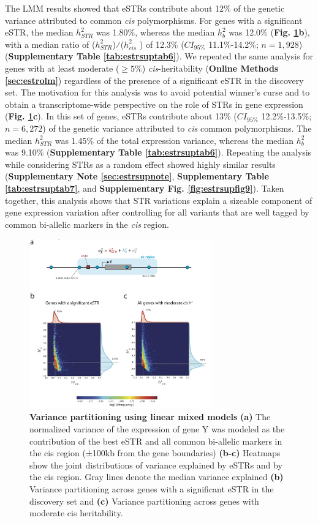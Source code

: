 The LMM results showed that eSTRs contribute about 12\% of the genetic variance attributed to common \emph{cis} polymorphisms. For genes with a significant eSTR, the median $h_{STR}^2$ was 1.80\%, whereas the median $h_b^2$ was 12.0\% (\textbf{Fig. \ref{fig:estrfig2}b}), with a median ratio of ($h_{STR}^2$)⁄($h_{cis}^2$ ) of 12.3\% ($CI_{95\%}$ 11.1\%-14.2\%; $n=1,928$) (\textbf{Supplementary Table \ref{tab:estrsuptab6}}). We repeated the same analysis for genes with at least moderate ($\geq 5\%$) \emph{cis}-heritability (\textbf{Online Methods \ref{sec:estrolm}}) regardless of the presence of a significant eSTR in the discovery set. The motivation for this analysis was to avoid potential winner’s curse \cite{Ioannidis2008} and to obtain a transcriptome-wide perspective on the role of STRs in gene expression (\textbf{Fig. \ref{fig:estrfig2}c}). In this set of genes, eSTRs contribute about 13\% ($CI_{95\%}$ 12.2\%-13.5\%; $n=6,272$) of the genetic variance attributed to \emph{cis} common polymorphisms.  The median $h_{STR}^2$ was 1.45\% of the total expression variance, whereas the median $h_b^2$ was 9.10\% (\textbf{Supplementary Table \ref{tab:estrsuptab6}}). Repeating the analysis while considering STRs as a random effect showed highly similar results (\textbf{Supplementary Note \ref{sec:estrsupnote}}, \textbf{Supplementary Table \ref{tab:estrsuptab7}}, and \textbf{Supplementary Fig. \ref{fig:estrsupfig9}}). Taken together, this analysis shows that STR variations explain a sizeable component of gene expression variation after controlling for all variants that are well tagged by common bi-allelic markers in the \emph{cis} region. 

\begin{figure}[h!]
\centering
\label{fig:estrfig2}
\includegraphics[width=0.7\textwidth]{Figures/Chapter4/Fig2}
\caption{\textbf{Variance partitioning using linear mixed models} \textbf{(a)} The normalized variance of the expression of gene Y was modeled as the contribution of the best eSTR and all common bi-allelic markers in the cis region (±100kb from the gene boundaries) \textbf{(b-c)} Heatmaps show the joint distributions of variance explained by eSTRs and by the cis region. Gray lines denote the median variance explained \textbf{(b)} Variance partitioning across genes with a significant eSTR in the discovery set and \textbf{(c)} Variance partitioning across genes with moderate cis heritability. }
\end{figure}

